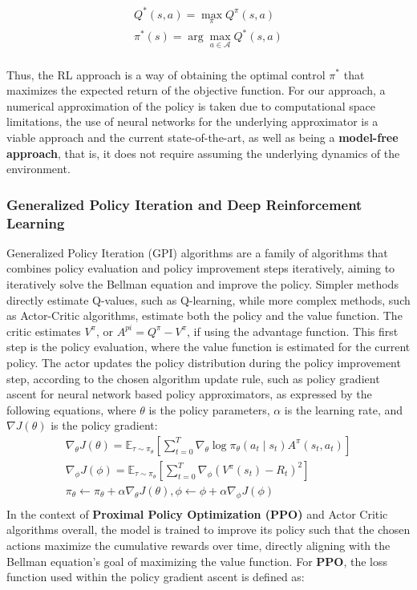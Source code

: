 \begin{gather*}
    Q^*(s, a) = \max_{\pi} Q^{\pi}(s, a)\\
    \pi^*(s) = \arg \max_{a \in \mathcal{A}} Q^*(s, a)\\
\end{gather*}

Thus, the RL approach is a way of obtaining the optimal control $\pi^*$  that maximizes the expected return of the objective function.
For our approach, a numerical approximation of the policy is taken due to computational space limitations,
the use of neural networks for the underlying approximator is a viable approach and the current state-of-the-art,
as well as being a \textbf{model-free approach}, that is, it does not require assuming the underlying dynamics of the environment.

\subsubsection{Generalized Policy Iteration and Deep Reinforcement Learning}

Generalized Policy Iteration (GPI) algorithms are a family of algorithms that combines policy evaluation and policy improvement steps iteratively,
aiming to iteratively solve the Bellman equation and improve the policy.
Simpler methods directly estimate Q-values, such as Q-learning, while more complex methods,
such as Actor-Critic algorithms, estimate both the policy and the value function.
The critic estimates $V^\pi$, or $A^{pi} = Q^{\pi} - V^{\pi}$, if using the advantage function.
This first step is the policy evaluation, where the value function is estimated for the current policy.
The actor updates the policy distribution during the policy improvement step,
according to the chosen algorithm update rule, such as policy gradient ascent for neural network based policy approximators, as expressed by the following equations,
where $\theta$ is the policy parameters, $\alpha$ is the learning rate, and $\nabla J(\theta)$ is the policy gradient:
\begin{gather*}
    \nabla_{\theta} J(\theta) = \mathbb{E}_{\tau \sim \pi_{\theta}} \left[ \sum_{t=0}^{T} \nabla_{\theta} \log \pi_{\theta}(a_t \mid s_t) A^{\pi}(s_t, a_t) \right]\\
    \nabla_{\phi} J(\phi) = \mathbb{E}_{\tau \sim \pi_{\theta}} \left[ \sum_{t=0}^{T} \nabla_{\phi} \left( V^{\pi}(s_t) - R_t \right)^2 \right]\\
    \pi_{\theta} \leftarrow \pi_{\theta} + \alpha \nabla_{\theta} J(\theta), \phi \leftarrow \phi + \alpha \nabla_{\phi} J(\phi)\\
\end{gather*}
In the context of \textbf{Proximal Policy Optimization (PPO)} and Actor Critic algorithms overall,
the model is trained to improve its policy such that the chosen actions maximize the cumulative rewards over time,
directly aligning with the Bellman equation's goal of maximizing the value function.
For \textbf{PPO}, the loss function used within the policy gradient ascent is defined as:

